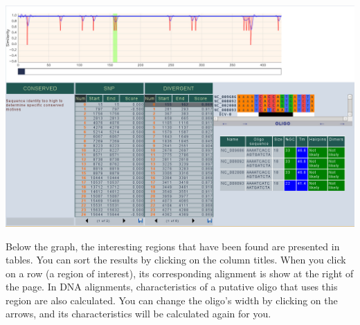 \documentclass[12pt,oneside,a4paper,english]{article}  %
\begin{document}
\begin{center}
		\includegraphics[width=\linewidth]{pics/graph.jpg}
\end{center}

Below the graph, the interesting regions that have been found are presented in tables. You can sort the results by clicking on the column titles. When you click on a row (a region of interest), its corresponding alignment is show at the right of the page. In DNA alignments, characteristics of a putative oligo that uses this region are also calculated. You can change the oligo's width by clicking on the arrows, and its characteristics will be calculated again for you.




%
\end{document}
